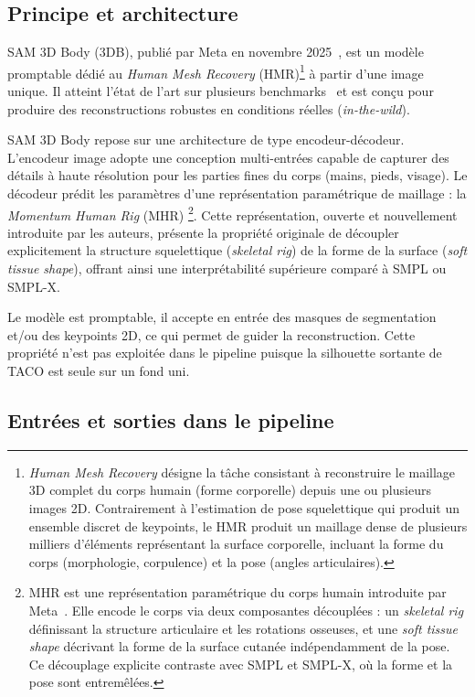 \subsection{Principe et architecture}

SAM 3D Body (3DB), publié par Meta en novembre 2025~\cite{SAM-3D-Body-2026}, est un modèle promptable dédié au \emph{Human Mesh Recovery} (HMR)\footnote{\emph{Human Mesh Recovery} désigne la tâche consistant à reconstruire le maillage 3D complet du corps humain (forme corporelle) depuis une ou plusieurs images 2D. Contrairement à l'estimation de pose squelettique qui produit un ensemble discret de keypoints, le HMR produit un maillage dense de plusieurs milliers d'éléments représentant la surface corporelle, incluant la forme du corps (morphologie, corpulence) et la pose (angles articulaires).} à partir d'une image unique. Il atteint l'état de l'art sur plusieurs benchmarks~\cite{SAM-3D-Body-2026} et est conçu pour produire des reconstructions robustes en conditions réelles (\textit{in-the-wild}).

SAM 3D Body repose sur une architecture de type encodeur-décodeur. L'encodeur image adopte une conception multi-entrées capable de capturer des détails à haute résolution pour les parties fines du corps (mains, pieds, visage). Le décodeur prédit les paramètres d'une représentation paramétrique de maillage : la \emph{Momentum Human Rig} (MHR) \footnote{MHR est une représentation paramétrique du corps humain introduite par Meta~\cite{MHR-2025}. Elle encode le corps via deux composantes découplées : un \textit{skeletal rig} définissant la structure articulaire et les rotations osseuses, et une \textit{soft tissue shape} décrivant la forme de la surface cutanée indépendamment de la pose. Ce découplage explicite contraste avec SMPL et SMPL-X, où la forme et la pose sont entremêlées.}. Cette représentation, ouverte et nouvellement introduite par les auteurs, présente la propriété originale de découpler explicitement la structure squelettique (\textit{skeletal rig}) de la forme de la surface (\textit{soft tissue shape}), offrant ainsi une interprétabilité supérieure comparé à SMPL ou SMPL-X.

Le modèle est promptable, il accepte en entrée des masques de segmentation et/ou des keypoints 2D, ce qui permet de guider la reconstruction. Cette propriété n'est pas exploitée dans le pipeline puisque la silhouette sortante de TACO est seule sur un fond uni.

\subsection{Entrées et sorties dans le pipeline}

